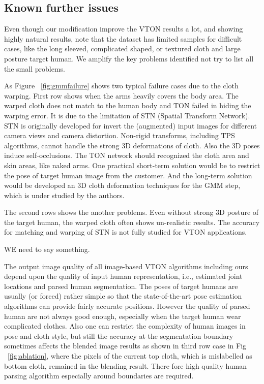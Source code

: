\subsection{Known further issues}

Even though our modification  improve the VTON results a lot, and showing highly natural results, note that the dataset has limited samples for difficult cases, like the long sleeved, complicated shaped, or textured cloth and large posture target human. We amplify the key problems identified not try to list all the small problems. 

As Figure ~\ref{fig:gmmfailure} shows two typical failure cases due to the cloth warping. First row shows when the arms heavily covers the body area. The warped cloth does not match to the human body and TON failed in hiding the warping error. It is due to the limitation of STN (Spatial Transform Network). STN is originally developed for invert the (augmented) input images for different camera views and camera distortion. Non-rigid transforms, including TPS algorithms, cannot handle the strong 3D deformations of cloth.  Also the 3D poses induce self-occlusions. The TON network should recognized the cloth area and skin areas, like naked arms. One practical short-term solution would be to restrict the pose of target human image from the customer. And the long-term solution would be developed an 3D cloth deformation techniques for the GMM step, which is under studied by the authors. 

The second rows shows the another problems. Even without strong 3D posture of the target human, the warped cloth often shows un-realistic results. The accuracy for matching and warping of STN is not fully studied for VTON applications. 

WE need to say something.
    
The output image quality of all image-based VTON algorithms including ours depend upon the quality of input human representation, i.e., estimated joint locations and parsed human segmentation. The poses of target humans are usually (or forced) rather simple so that the state-of-the-art pose estimation algorithms can provide fairly accurate positions. However the quality of parsed human are not always good enough, especially when the target human wear complicated clothes. Also one can restrict the complexity of human images in pose and cloth style, but still the accuracy at the segmentation boundary sometimes affects the blended image results as shown in third row case in Fig ~\ref{fig:ablation}, where the pixels of the current top cloth, which is mislabelled as bottom cloth, remained in the blending result. There fore high quality human parsing algorithm especially around boundaries are required.   


